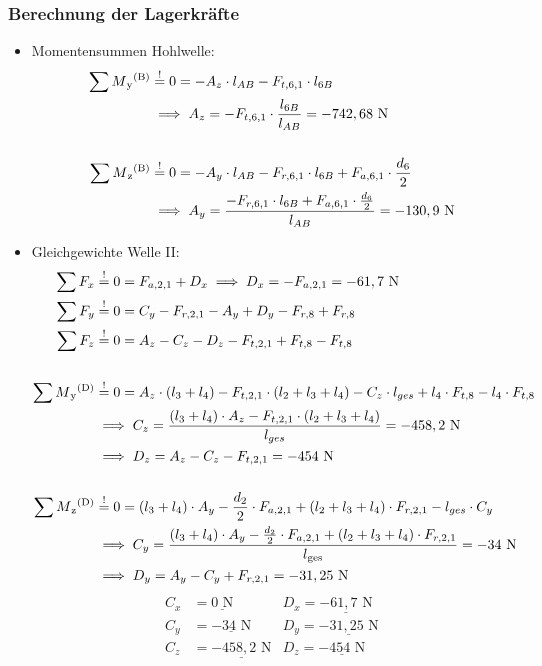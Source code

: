 \subsubsection{Berechnung der Lagerkräfte}
\begin{itemize}
\item Momentensummen Hohlwelle:
\begin{align*}
	\sum M\textsubscript{y}\textsuperscript{(B)} &\overset{!}{=} 0 = -A_z \cdot l_{AB} - F_{t,6,1} \cdot l_{6B} \\
	&\implies A_z = -F_{t,6,1} \cdot \frac{l_{6B}}{l_{AB}} = -742,68 \text{ N} \\ \\
	\sum M\textsubscript{z}\textsuperscript{(B)} &\overset{!}{=} 0 = -A_y \cdot l_{AB} - F_{r,6,1} \cdot l_{6B} + F_{a,6,1} \cdot \frac{d_6}{2}\\
	&\implies A_y = \frac{-F_{r,6,1} \cdot l_{6B} + F_{a,6,1} \cdot \frac{d_6}{2}} {l_{AB}}= -130,9 \text{ N} 
\end{align*}
\item Gleichgewichte Welle II:
\begin{align*}
	\sum F_x &\overset{!}{=} 0 = F_{a,2,1} + D_x \implies D_x = -F_{a,2,1} = -61,7 \text{ N} \\
	\sum F_y &\overset{!}{=} 0 = C_y - F_{r,2,1}-A_y +D_y - F_{r,8} + F_{r,8}\\ 
	\sum F_z &\overset{!}{=} 0 = A_z - C_z - D_z - F_{t,2,1} + F_{t,8} - F_{t,8}\\ \\
	\sum M\textsubscript{y}\textsuperscript{(D)} &\overset{!}{=} 0 = A_z \cdot (l_3+l_4)- F_{t,2,1} \cdot (l_2+l_3+l_4) - C_z \cdot l_{ges} +l_4 \cdot F_{t,8}- l_4 \cdot F_{t,8} \\ 
	&\implies C_z = \frac{(l_3+l_4) \cdot A_z - F_{t,2,1} \cdot (l_2+l_3+l_4)}{l_{ges}} = -458,2 \text { N} \\ 
	& \implies D_z = A_z - C_z - F_{t,2,1}= -454 \text{ N}\\ \\
	\sum M\textsubscript{z}\textsuperscript{(D)} &\overset{!}{=} 0 = (l_3+l_4) \cdot A_y - \frac{d_2}{2} \cdot F_{a,2,1} + (l_2+l_3+l_4) \cdot F_{r,2,1}- l_{ges} \cdot C_y  \\ 
	&\implies C_y = \frac{(l_3+l_4) \cdot A_y - \frac{d_2}{2} \cdot F_{a,2,1} + (l_2+l_3+l_4) \cdot F_{r,2,1}}{l\textsubscript{ges}} = -34 \text{ N}\\ 
	& \implies D_y =   A_y - C_y + F_{r,2,1} = -31,25\text{ N}\\ 
\end{align*}
\begin{align*}
C_x &= \underline{0\text{ N}} & D_x= \underline{-61,7\text{ N}}\\
C_y &= \underline{-34\text{ N}} & D_y= \underline{-31,25\text{ N}}\\
C_z &= \underline{-458,2\text{ N}} & D_z= \underline{-454\text{ N}}\\
\end{align*}
\end{itemize}
\newpage
